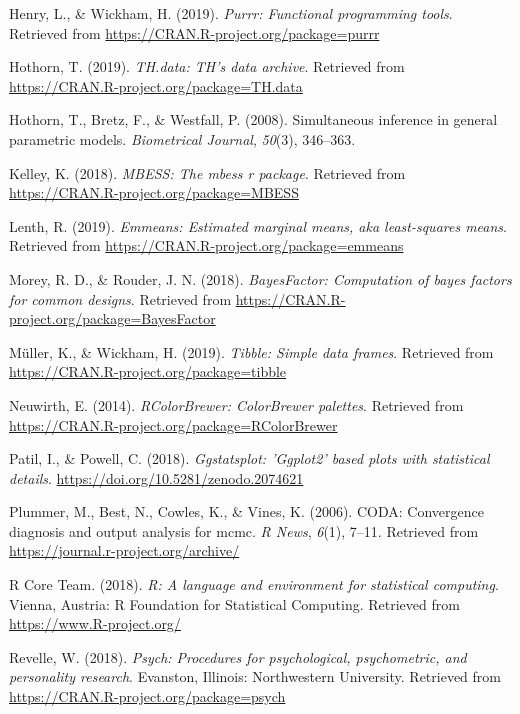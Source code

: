 \documentclass[man]{apa6}
\begin{document}
\leavevmode\hypertarget{ref-R-purrr}{}%
Henry, L., \& Wickham, H. (2019). \emph{Purrr: Functional programming tools}. Retrieved from \url{https://CRAN.R-project.org/package=purrr}

\leavevmode\hypertarget{ref-R-TH.data}{}%
Hothorn, T. (2019). \emph{TH.data: TH's data archive}. Retrieved from \url{https://CRAN.R-project.org/package=TH.data}

\leavevmode\hypertarget{ref-R-multcomp}{}%
Hothorn, T., Bretz, F., \& Westfall, P. (2008). Simultaneous inference in general parametric models. \emph{Biometrical Journal}, \emph{50}(3), 346--363.

\leavevmode\hypertarget{ref-R-MBESS}{}%
Kelley, K. (2018). \emph{MBESS: The mbess r package}. Retrieved from \url{https://CRAN.R-project.org/package=MBESS}

\leavevmode\hypertarget{ref-R-emmeans}{}%
Lenth, R. (2019). \emph{Emmeans: Estimated marginal means, aka least-squares means}. Retrieved from \url{https://CRAN.R-project.org/package=emmeans}

\leavevmode\hypertarget{ref-R-BayesFactor}{}%
Morey, R. D., \& Rouder, J. N. (2018). \emph{BayesFactor: Computation of bayes factors for common designs}. Retrieved from \url{https://CRAN.R-project.org/package=BayesFactor}

\leavevmode\hypertarget{ref-R-tibble}{}%
Müller, K., \& Wickham, H. (2019). \emph{Tibble: Simple data frames}. Retrieved from \url{https://CRAN.R-project.org/package=tibble}

\leavevmode\hypertarget{ref-R-RColorBrewer}{}%
Neuwirth, E. (2014). \emph{RColorBrewer: ColorBrewer palettes}. Retrieved from \url{https://CRAN.R-project.org/package=RColorBrewer}

\leavevmode\hypertarget{ref-R-ggstatsplot}{}%
Patil, I., \& Powell, C. (2018). \emph{Ggstatsplot: 'Ggplot2' based plots with statistical details}. \url{https://doi.org/10.5281/zenodo.2074621}

\leavevmode\hypertarget{ref-R-coda}{}%
Plummer, M., Best, N., Cowles, K., \& Vines, K. (2006). CODA: Convergence diagnosis and output analysis for mcmc. \emph{R News}, \emph{6}(1), 7--11. Retrieved from \url{https://journal.r-project.org/archive/}

\leavevmode\hypertarget{ref-R-base}{}%
R Core Team. (2018). \emph{R: A language and environment for statistical computing}. Vienna, Austria: R Foundation for Statistical Computing. Retrieved from \url{https://www.R-project.org/}

\leavevmode\hypertarget{ref-R-psych}{}%
Revelle, W. (2018). \emph{Psych: Procedures for psychological, psychometric, and personality research}. Evanston, Illinois: Northwestern University. Retrieved from \url{https://CRAN.R-project.org/package=psych}
\end{document}
